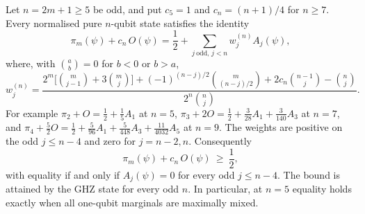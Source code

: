 \begin{theorem}\label{thm:odd-spinflip-tradeoff}
Let $n=2m+1\ge5$ be odd, and put $c_5=1$ and $c_n=(n+1)/4$ for $n\ge7$. Every normalised pure $n$-qubit state satisfies the identity
\begin{equation}\label{eq:odd-tradeoff}
 \pi_m(\psi)+c_n\,O(\psi)=\frac12+\sum_{j\ \mathrm{odd},\,j<n}w_j^{(n)}A_j(\psi),
\end{equation}
where, with $\binom ab=0$ for $b<0$ or $b>a$,
\begin{equation}\label{eq:odd-tradeoff-weights}
 w_j^{(n)}=\frac{2^m\bigl[\binom m{j-1}+3\binom mj\bigr]+(-1)^{(n-j)/2}\binom m{(n-j)/2}+2c_n\binom{n-1}j-\binom nj}{2^n\binom nj}.
\end{equation}
For example $\pi_2+O=\tfrac12+\tfrac15A_1$ at $n=5$,
$\pi_3+2O=\tfrac12+\tfrac3{28}A_1+\tfrac3{140}A_3$ at $n=7$, and
$\pi_4+\tfrac52O=\tfrac12+\tfrac5{96}A_1+\tfrac5{448}A_3+\tfrac{11}{4032}A_5$ at $n=9$. The weights are positive on the odd $j\le n-4$
and zero for $j=n-2,n$. Consequently
\[
 \pi_m(\psi)+c_n\,O(\psi)\ \ge\ \frac12 ,
\]
with equality if and only if $A_j(\psi)=0$ for every odd $j\le n-4$. The bound is attained by the GHZ state for every
odd $n$. In particular, at $n=5$ equality holds exactly when all one-qubit marginals are maximally mixed.
\end{theorem}
